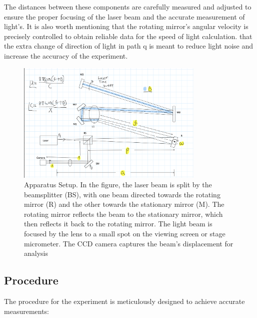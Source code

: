 \documentclass[12pt]{article}
\begin{document}
        \newpage
             
        The distances between these components are carefully measured and adjusted to ensure 
        the proper focusing of the laser beam and the accurate measurement of light’s. It is also worth mentioning that the rotating mirror's angular velocity is precisely controlled to obtain reliable data for the speed of light calculation.
        that the extra change of direction of light in path q is meant to reduce light noise and increase the accuracy of the experiment.

        \begin{figure}[!h]
            \centering
            \includegraphics[width=0.80\textwidth]{../Imgs/used_app.png}
            \caption{Apparatus Setup. In the figure, the laser beam is split by the beamsplitter (BS),
            with one beam directed towards the rotating mirror (R) and the other towards the stationary mirror (M).
            The rotating mirror reflects the beam to the stationary mirror, which then reflects it back to the rotating mirror.
            The light beam is focused by the lens to a small spot on the viewing screen or stage micrometer. The CCD camera captures
            the beam's displacement for analysis}
            \label{fig: Apparatus Setup}
        \end{figure}
            
        \subsection{Procedure}
        The procedure for the experiment is meticulously designed to achieve accurate measurements:
        
\end{document}
